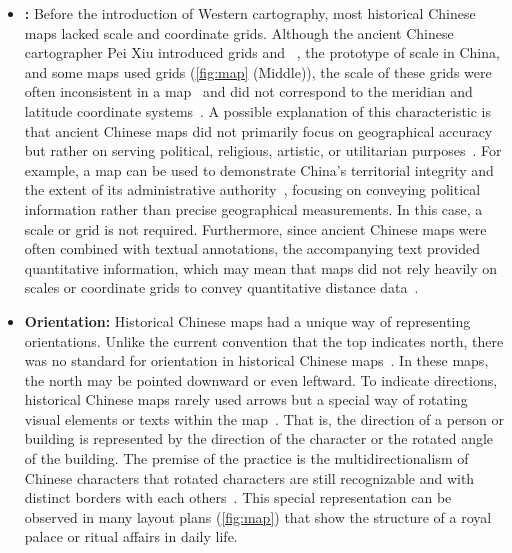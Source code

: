 \begin{itemize}[leftmargin=3.5mm]
    \item \textbf{:}
    Before the introduction of Western cartography, most historical Chinese maps lacked scale and coordinate grids. 
    Although the ancient Chinese cartographer Pei Xiu introduced grids and ~\cite{needham1974science, Yee1994Reinterpreting}, the prototype of scale in China, and some maps used grids (\cref{fig:map} (Middle)), the scale of these grids were often inconsistent in a map~\cite{Yee1994Reinterpreting} and did not correspond to the meridian and latitude coordinate systems~\cite{Yee1994Reinterpreting}. 
    A possible explanation of this characteristic is that ancient Chinese maps did not primarily focus on geographical accuracy but rather on serving political, religious, artistic, or utilitarian purposes~\cite{Yee1994Reinterpreting}. 
    For example, a map can be used to demonstrate China's territorial integrity and the extent of its administrative authority~\cite{Yee1994Reinterpreting}, focusing on conveying political information rather than precise geographical measurements. 
    In this case, a scale or grid is not required.
    Furthermore, since ancient Chinese maps were often combined with textual annotations, the accompanying text provided quantitative information, which may mean that maps did not rely heavily on scales or coordinate grids to convey quantitative distance data~\cite{Yee1994Reinterpreting}.

    \item \textbf{Orientation:}
          Historical Chinese maps had a unique way of representing orientations.
 Unlike the current convention that the top indicates north, there was no standard for orientation in historical Chinese maps~\cite{Baur2019Cultural}.
 In these maps, the north may be pointed downward or even leftward.
 To indicate directions, historical Chinese maps rarely used arrows but a special way of rotating visual elements or texts within the map~\cite{Baur2019Cultural}.
 That is, the direction of a person or building is represented by the direction of the character or the rotated angle of the building.
 The premise of the practice is the multidirectionalism of Chinese characters that rotated characters are still recognizable and with distinct borders with each others~\cite{Baur2019Cultural}.
 This special representation can be observed in many layout plans (\cref{fig:map}) that show the structure of a royal palace or ritual affairs in daily life.
\end{itemize}

